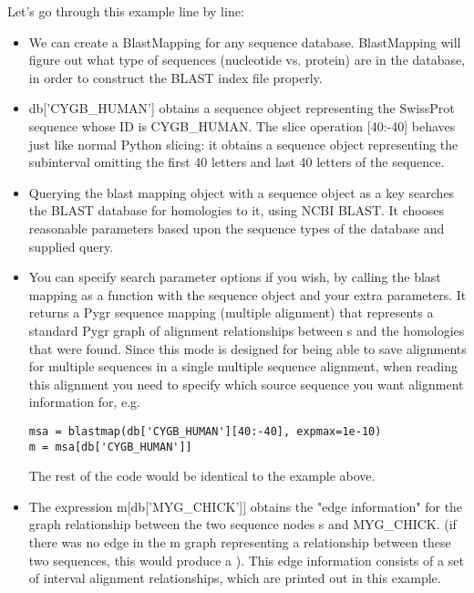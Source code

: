 \documentclass{howto}
\begin{document}
Let's go through this example line by line:

\begin{itemize}

\item    
We can create a BlastMapping for any sequence database.  BlastMapping
will figure out what type of sequences (nucleotide vs. protein) are
in the database, in order to construct the BLAST index file properly.

\item
db['CYGB_HUMAN'] obtains a sequence object representing the SwissProt sequence whose ID is CYGB_HUMAN.  The slice operation [40:-40] behaves just like normal Python slicing: it obtains a sequence object representing the subinterval omitting the first 40 letters and last 40 letters of the sequence.

\item
Querying the blast mapping object with a sequence object as a key
searches the BLAST database for homologies to it, using NCBI BLAST.  It chooses reasonable parameters based upon the sequence types of the database and supplied query.  

\item You can specify search parameter options if you wish, by calling
the blast mapping as a function with the sequence object and
your extra parameters.  It returns a Pygr sequence mapping (multiple alignment) that represents a standard Pygr graph of alignment relationships between s and the homologies that were found.  Since this mode is designed for being
able to save alignments for multiple sequences in a single multiple
sequence alignment, when reading this alignment you need to specify
which source sequence you want alignment information for, e.g.
\begin{verbatim}
msa = blastmap(db['CYGB_HUMAN'][40:-40], expmax=1e-10)
m = msa[db['CYGB_HUMAN']]
\end{verbatim}
The rest of the code would be identical to the example above.

\item
The expression m[db['MYG_CHICK']] obtains the "edge information" for the graph relationship between the two sequence nodes s and MYG_CHICK.  (if there was no edge in the m graph representing a relationship between these two sequences, this would produce a 
).  This edge information consists of a set of interval alignment relationships, which are printed out in this example.

\end{itemize}
\end{document}
